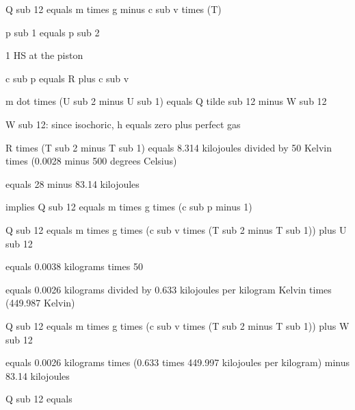 Q sub 12 equals m times g minus c sub v times (T)

p sub 1 equals p sub 2

1 HS at the piston

c sub p equals R plus c sub v

m dot times (U sub 2 minus U sub 1) equals Q tilde sub 12 minus W sub 12

W sub 12: since isochoric, h equals zero plus perfect gas

R times (T sub 2 minus T sub 1) equals 8.314 kilojoules divided by 50 Kelvin times (0.0028 minus 500 degrees Celsius)

equals 28 minus 83.14 kilojoules

implies Q sub 12 equals m times g times (c sub p minus 1)

Q sub 12 equals m times g times (c sub v times (T sub 2 minus T sub 1)) plus U sub 12

equals 0.0038 kilograms times 50

equals 0.0026 kilograms divided by 0.633 kilojoules per kilogram Kelvin times (449.987 Kelvin)

Q sub 12 equals m times g times (c sub v times (T sub 2 minus T sub 1)) plus W sub 12

equals 0.0026 kilograms times (0.633 times 449.997 kilojoules per kilogram) minus 83.14 kilojoules

Q sub 12 equals